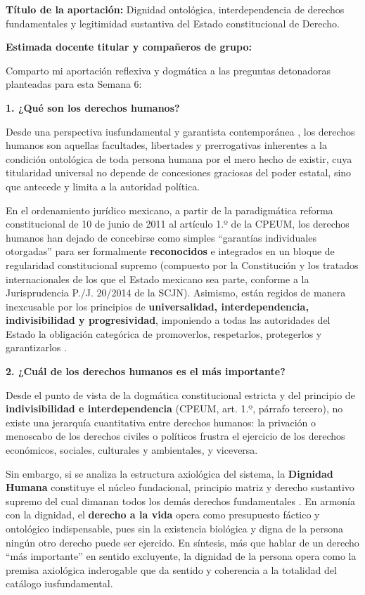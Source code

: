 \documentclass[spanish,letterpaper,oneside]{article}
\newcommand{\foroCopyButton}[1]{%
  \textattachfile[appearance={},description={Participación íntegra para el foro},mimetype=text/plain]{#1}{%
    \colorbox{unadmGreen}{\small\textcolor{white}{\,Copiar participación\,}}%
  }%
}
\begin{document}
\begin{forobox}[title={Participación para el Foro de Derechos Humanos -- Texto para publicación}]
\textbf{Título de la aportación:} Dignidad ontológica, interdependencia de derechos fundamentales y legitimidad sustantiva del Estado constitucional de Derecho. \hfill \foroCopyButton{foro-participacion-Actividad-6.txt}

\bigskip
\textbf{Estimada docente titular y compañeros de grupo:}

Comparto mi aportación reflexiva y dogmática a las preguntas detonadoras planteadas para esta Semana 6:

\medskip
\textbf{1. ¿Qué son los derechos humanos?}

Desde una perspectiva iusfundamental y garantista contemporánea \citep{ferrajoli2001,bobbio1991}, los derechos humanos son aquellas facultades, libertades y prerrogativas inherentes a la condición ontológica de toda persona humana por el mero hecho de existir, cuya titularidad universal no depende de concesiones graciosas del poder estatal, sino que antecede y limita a la autoridad política.

En el ordenamiento jurídico mexicano, a partir de la paradigmática reforma constitucional de 10 de junio de 2011 al artículo 1.º de la CPEUM, los derechos humanos han dejado de concebirse como simples ``garantías individuales otorgadas'' para ser formalmente \textbf{reconocidos} e integrados en un bloque de regularidad constitucional supremo (compuesto por la Constitución y los tratados internacionales de los que el Estado mexicano sea parte, conforme a la Jurisprudencia P./J. 20/2014 de la SCJN). Asimismo, están regidos de manera inexcusable por los principios de \textbf{universalidad, interdependencia, indivisibilidad y progresividad}, imponiendo a todas las autoridades del Estado la obligación categórica de promoverlos, respetarlos, protegerlos y garantizarlos \citep{scjnParametro2014}.

\medskip
\textbf{2. ¿Cuál de los derechos humanos es el más importante?}

Desde el punto de vista de la dogmática constitucional estricta y del principio de \textbf{indivisibilidad e interdependencia} (CPEUM, art. 1.º, párrafo tercero), no existe una jerarquía cuantitativa entre derechos humanos: la privación o menoscabo de los derechos civiles o políticos frustra el ejercicio de los derechos económicos, sociales, culturales y ambientales, y viceversa.

Sin embargo, si se analiza la estructura axiológica del sistema, la \textbf{Dignidad Humana} constituye el núcleo fundacional, principio matriz y derecho sustantivo supremo del cual dimanan todos los demás derechos fundamentales \citep{scjnDignidad2016}. En armonía con la dignidad, el \textbf{derecho a la vida} opera como presupuesto fáctico y ontológico indispensable, pues sin la existencia biológica y digna de la persona ningún otro derecho puede ser ejercido. En síntesis, más que hablar de un derecho ``más importante'' en sentido excluyente, la dignidad de la persona opera como la premisa axiológica inderogable que da sentido y coherencia a la totalidad del catálogo iusfundamental.


\end{forobox}
\end{document}
